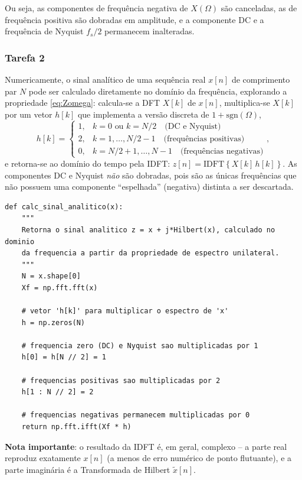 \documentclass[a4paper,twoside,12pt]{article}
\begin{document}
	\noindent Ou seja, as componentes de frequência negativa de $X(\Omega)$ são canceladas, as de frequência positiva são dobradas em amplitude, e a componente DC e a frequência de Nyquist $f_s/2$ permanecem inalteradas.
	
	\subsubsection*{Tarefa 2}
	
	Numericamente, o sinal analítico de uma sequência real $x[n]$ de comprimento par $N$ pode ser calculado diretamente no domínio da frequência, explorando a propriedade \eqref{eq:Zomega}: calcula-se a DFT $X[k]$ de $x[n]$, multiplica-se $X[k]$ por um vetor $h[k]$ que implementa a versão discreta de $1+\mathrm{sgn}(\Omega)$,
	\begin{equation}
		h[k] = 
		\begin{cases}
			1, & k = 0 \text{ ou } k = N/2 \quad \text{(DC e Nyquist)}\\
			2, & k = 1, \ldots, N/2 - 1 \quad \text{(frequências positivas)}\\
			0, & k = N/2+1, \ldots, N-1 \quad \text{(frequências negativas)}
		\end{cases},
	\end{equation}
	e retorna-se ao domínio do tempo pela IDFT: $z[n] = \mathrm{IDFT}\left\{X[k]\, h[k]\right\}$. As componentes DC e Nyquist \emph{não} são dobradas, pois são as únicas frequências que não possuem uma componente ``espelhada'' (negativa) distinta a ser descartada.
	
	\begin{lstlisting}[frame=single]
def calc_sinal_analitico(x):
    """
    Retorna o sinal analitico z = x + j*Hilbert(x), calculado no dominio
    da frequencia a partir da propriedade de espectro unilateral.
    """
    N = x.shape[0]
    Xf = np.fft.fft(x)
    
    # vetor 'h[k]' para multiplicar o espectro de 'x'
    h = np.zeros(N)
    
    # frequencia zero (DC) e Nyquist sao multiplicadas por 1
    h[0] = h[N // 2] = 1
    
    # frequencias positivas sao multiplicadas por 2
    h[1 : N // 2] = 2
    
    # frequencias negativas permanecem multiplicadas por 0
    return np.fft.ifft(Xf * h)
	\end{lstlisting}
	
	\noindent \textbf{Nota importante}: o resultado da IDFT é, em geral, complexo -- a parte real reproduz exatamente $x[n]$ (a menos de erro numérico de ponto flutuante), e a parte imaginária é a Transformada de Hilbert $\tilde{x}[n]$.
	
\end{document}
